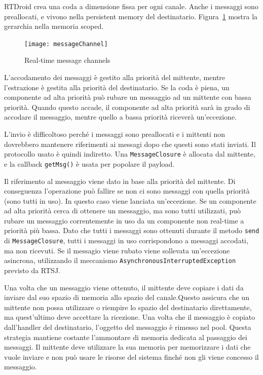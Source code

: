 RTDroid crea una coda a dimensione fissa per ogni canale. Anche i messaggi sono preallocati, e vivono nella persistent memory del destinatario. Figura~\ref{fig:messagechannel} mostra la gerarchia nella memoria scoped.
\begin{figure}[h]
	\centering
	\texttt{[image: messageChannel]}
	\caption{Real-time message channels}
	\label{fig:messagechannel}
\end{figure}

L'accodamento dei messaggi è gestito alla priorità del mittente, mentre l'estrazione è gestita alla priorità del destinatario. Se la coda è piena, un componente ad alta priorità può rubare un messaggio ad un mittente con bassa priorità. Quando questo accade, il componente ad alta priorità sarà in grado di accodare il messaggio, mentre quello a bassa priorità riceverà un'eccezione.

L'invio è difficoltoso perché i messaggi sono preallocati e i mittenti non dovrebbero mantenere riferimenti ai messagi dopo che questi sono stati inviati. Il protocollo usato è quindi indiretto. Una \texttt{MessageClosure} è allocata dal mittente, e la callback \texttt{getMsg()} è usata per popolare il payload.

Il riferimento al messaggio viene dato in base alla priorità del mittente. Di conseguenza l'operazione può fallire se non ci sono messaggi con quella priorità (sono tutti in uso). In questo caso viene lanciata un'eccezione. Se un componente ad alta priorità cerca di ottenere un messaggio, ma sono tutti utilizzati, può rubare un messaggio correntemente in uso da un componente non real-time a priorità più bassa. Dato che tutti i messaggi sono ottenuti durante il metodo \texttt{send} di \texttt{MessageClosure}, tutti i messaggi in uso corrispondono a messaggi accodati, ma non ricevuti. Se il messagio viene rubato viene sollevata un'eccezione asincrona, utilizzando il meccanismo \texttt{AsynchronousInterruptedException} previsto da RTSJ.

Una volta che un messaggio viene ottenuto, il mittente deve copiare i dati da inviare dal suo spazio di memoria allo spazio del canale.Questo assicura che un mittente non possa utilizzare o riempire lo spazio del destinatario direttamente, ma quest'ultimo deve accettare la ricezione. Una volta che il messaggio è copiato dall'handler del destinatario, l'oggetto del messaggio è rimesso nel pool. Questa strategia mantiene costante l'ammontare di memoria dedicata al passaggio dei messaggi. Il mittente deve utilizzare la sua memoria per memorizzare i dati che vuole inviare e non può usare le risorse del sistema finché non gli viene concesso il messaggio.

